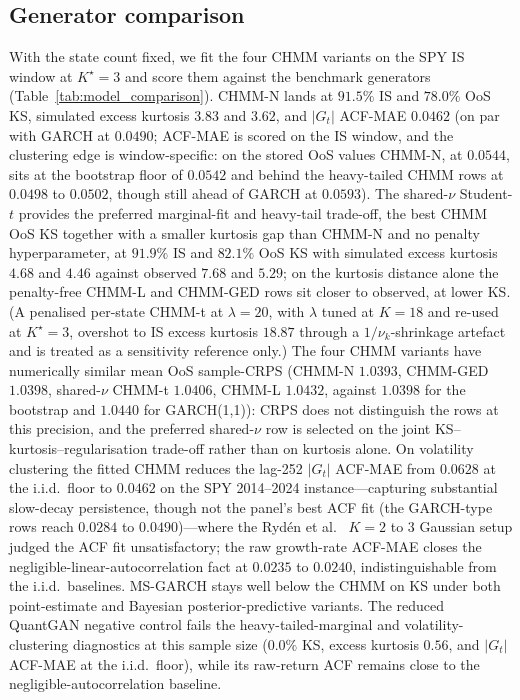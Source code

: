 \subsection{Generator comparison}
\label{sec:res_generators}

With the state count fixed, we fit the four CHMM variants on the SPY IS window at $K^\star = 3$ and score them against the benchmark generators (Table~\ref{tab:model_comparison}). CHMM-N lands at $91.5\%$ IS and $78.0\%$ OoS KS, simulated excess kurtosis $3.83$ and $3.62$, and $|G_t|$ ACF-MAE $0.0462$ (on par with GARCH at $0.0490$; ACF-MAE is scored on the IS window, and the clustering edge is window-specific: on the stored OoS values CHMM-N, at $0.0544$, sits at the bootstrap floor of $0.0542$ and behind the heavy-tailed CHMM rows at $0.0498$ to $0.0502$, though still ahead of GARCH at $0.0593$). The shared-$\nu$ Student-$t$ provides the preferred marginal-fit and heavy-tail trade-off, the best CHMM OoS KS together with a smaller kurtosis gap than CHMM-N and no penalty hyperparameter, at $91.9\%$ IS and $82.1\%$ OoS KS with simulated excess kurtosis $4.68$ and $4.46$ against observed $7.68$ and $5.29$; on the kurtosis distance alone the penalty-free CHMM-L and CHMM-GED rows sit closer to observed, at lower KS. (A penalised per-state CHMM-t at $\lambda = 20$, with $\lambda$ tuned at $K = 18$ and re-used at $K^\star = 3$, overshot to IS excess kurtosis $18.87$ through a $1/\nu_k$-shrinkage artefact and is treated as a sensitivity reference only.) The four CHMM variants have numerically similar mean OoS sample-CRPS (CHMM-N $1.0393$, CHMM-GED $1.0398$, shared-$\nu$ CHMM-t $1.0406$, CHMM-L $1.0432$, against $1.0398$ for the bootstrap and $1.0440$ for GARCH(1,1)): CRPS does not distinguish the rows at this precision, and the preferred shared-$\nu$ row is selected on the joint KS--kurtosis--regularisation trade-off rather than on kurtosis alone. On volatility clustering the fitted CHMM reduces the lag-252 $|G_t|$ ACF-MAE from $0.0628$ at the i.i.d.\ floor to $0.0462$ on the SPY 2014--2024 instance---capturing substantial slow-decay persistence, though not the panel's best ACF fit (the GARCH-type rows reach $0.0284$ to $0.0490$)---where the Ryd\'{e}n et al.~\cite{ryden1998stylized} $K = 2$ to $3$ Gaussian setup judged the ACF fit unsatisfactory; the raw growth-rate ACF-MAE closes the negligible-linear-autocorrelation fact at $0.0235$ to $0.0240$, indistinguishable from the i.i.d.\ baselines. MS-GARCH stays well below the CHMM on KS under both point-estimate and Bayesian posterior-predictive variants. The reduced QuantGAN negative control fails the heavy-tailed-marginal and volatility-clustering diagnostics at this sample size ($0.0\%$ KS, excess kurtosis $0.56$, and $|G_t|$ ACF-MAE at the i.i.d.\ floor), while its raw-return ACF remains close to the negligible-autocorrelation baseline.

